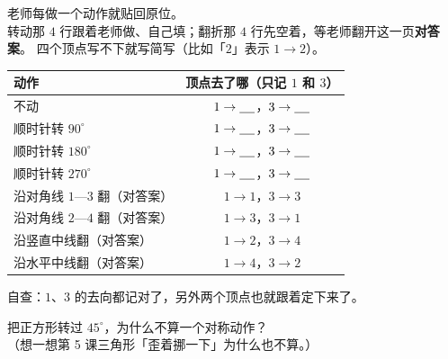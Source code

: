 \begin{dongshou}[边看边记]
  老师每做一个动作就贴回原位。\\
  转动那 \(4\) 行跟着老师做、自己填；翻折那 \(4\) 行先空着，等老师翻开这一页\textbf{对答案}。
  四个顶点写不下就写简写（比如「\(2\)」表示 \(1\to 2\)）。

  \begin{center}
  {\small
  \begin{tabular}{@{}lc@{}}
    \toprule
    动作 & 顶点去了哪（只记 \(1\) 和 \(3\)） \\
    \midrule
    \rule{0pt}{2.6ex}不动 & \(1\to\underline{\hspace{1.2em}}\)，\(3\to\underline{\hspace{1.2em}}\) \\[3pt]
    \rule{0pt}{2.6ex}顺时针转 \(90^\circ\) & \(1\to\underline{\hspace{1.2em}}\)，\(3\to\underline{\hspace{1.2em}}\) \\[3pt]
    \rule{0pt}{2.6ex}顺时针转 \(180^\circ\) & \(1\to\underline{\hspace{1.2em}}\)，\(3\to\underline{\hspace{1.2em}}\) \\[3pt]
    \rule{0pt}{2.6ex}顺时针转 \(270^\circ\) & \(1\to\underline{\hspace{1.2em}}\)，\(3\to\underline{\hspace{1.2em}}\) \\
    \midrule
    \rule{0pt}{2.6ex}沿对角线 \(1\text{—}3\) 翻（对答案） & \(1\to 1\)，\(3\to 3\) \\[3pt]
    \rule{0pt}{2.6ex}沿对角线 \(2\text{—}4\) 翻（对答案） & \(1\to 3\)，\(3\to 1\) \\[3pt]
    \rule{0pt}{2.6ex}沿竖直中线翻（对答案） & \(1\to 2\)，\(3\to 4\) \\[3pt]
    \rule{0pt}{2.6ex}沿水平中线翻（对答案） & \(1\to 4\)，\(3\to 2\) \\
    \bottomrule
  \end{tabular}}
  \end{center}
  自查：\(1\)、\(3\) 的去向都记对了，另外两个顶点也就跟着定下来了。
\end{dongshou}

\begin{sikao}[反例]
  把正方形转过 \(45^\circ\)，为什么不算一个对称动作？\\
  （想一想第 5 课三角形「歪着挪一下」为什么也不算。）
\end{sikao}

